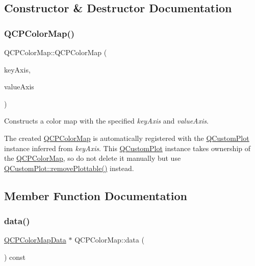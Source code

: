 \subsection{Constructor \& Destructor Documentation}
\mbox{\label{class_q_c_p_color_map_aa37e976d2ee1e2be6c4cd88a64b36215}} 
\subsubsection{\texorpdfstring{Q\+C\+P\+Color\+Map()}{QCPColorMap()}}
{\footnotesize\ttfamily Q\+C\+P\+Color\+Map\+::\+Q\+C\+P\+Color\+Map (\begin{DoxyParamCaption}\item[{\mbox{\hyperlink{class_q_c_p_axis}{Q\+C\+P\+Axis}} $\ast$}]{key\+Axis,  }\item[{\mbox{\hyperlink{class_q_c_p_axis}{Q\+C\+P\+Axis}} $\ast$}]{value\+Axis }\end{DoxyParamCaption})\hspace{0.3cm}{\ttfamily [explicit]}}

Constructs a color map with the specified {\itshape key\+Axis} and {\itshape value\+Axis}.

The created \mbox{\hyperlink{class_q_c_p_color_map}{Q\+C\+P\+Color\+Map}} is automatically registered with the \mbox{\hyperlink{class_q_custom_plot}{Q\+Custom\+Plot}} instance inferred from {\itshape key\+Axis}. This \mbox{\hyperlink{class_q_custom_plot}{Q\+Custom\+Plot}} instance takes ownership of the \mbox{\hyperlink{class_q_c_p_color_map}{Q\+C\+P\+Color\+Map}}, so do not delete it manually but use \mbox{\hyperlink{class_q_custom_plot_af3dafd56884208474f311d6226513ab2}{Q\+Custom\+Plot\+::remove\+Plottable()}} instead. 

\subsection{Member Function Documentation}
\mbox{\label{class_q_c_p_color_map_a047d7eb3ae657f93f2f39b5e68b79451}} 
\subsubsection{\texorpdfstring{data()}{data()}}
{\footnotesize\ttfamily \mbox{\hyperlink{class_q_c_p_color_map_data}{Q\+C\+P\+Color\+Map\+Data}} $\ast$ Q\+C\+P\+Color\+Map\+::data (\begin{DoxyParamCaption}{ }\end{DoxyParamCaption}) const\hspace{0.3cm}{\ttfamily [inline]}}

